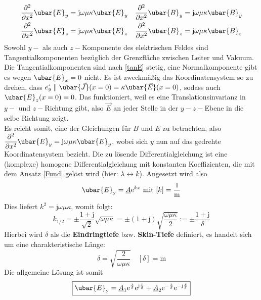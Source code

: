 			        \begin{align}
				        \dfrac{\partial^2}{\partial x^2} \ubar{E}_y & = \mathrm{j}\omega \mu \kappa \ubar{E}_y & \dfrac{\partial^2}{\partial x^2} \ubar{B}_y & = \mathrm{j}\omega \mu \kappa \ubar{B}_y \\
				        \dfrac{\partial^2}{\partial x^2} \ubar{E}_z & = \mathrm{j}\omega \mu \kappa \ubar{E}_z & \dfrac{\partial^2}{\partial x^2} \ubar{B}_z & = \mathrm{j}\omega \mu \kappa \ubar{B}_z
			        \end{align}
			    Sowohl $y-$ als auch $z-$Komponente des elektrischen Feldes sind Tangentialkomponenten bezüglich der Grenzfläche zwischen Leiter und Vakuum. Die Tangentialkomponenten sind nach \ref{tanE} stetig, eine Normalkomponente gibt es wegen $\ubar{E}_x=0$ nicht. Es ist zweckmäßig das Koordinatensystem so zu drehen, dass $\vec{e_y} \parallel \ubar{\vec{J}}(x=0) = \kappa\ubar{\vec{E}}(x=0)$, sodass auch $\ubar{E}_z(x=0)=0$. Das funktioniert, weil es eine Translationsinvarianz in $y-$ und $z-$Richtung gibt, also $\vec{E}$ an jeder Stelle in der $y-z-$Ebene in die selbe Richtung zeigt.\\
			    Es reicht somit, eine der Gleichungen für $B$ und $E$ zu betrachten, also $\dfrac{\partial^2}{\partial x^2} \ubar{E}_y = \mathrm{j}\omega \mu \kappa \ubar{E}_y$, wobei sich $y$ nun auf das gedrehte Koordinatensystem bezieht. Die zu lösende Differentialgleichung ist eine (komplexe) homogene Differentialgleichung mit konstanten Koeffizienten, die mit dem Ansatz \ref{Fund} gelöst wird (hier: $\lambda\leftrightarrow k$). Angesetzt wird also 
			   $$\ubar{E}_\mathrm{y} = \underline{A}  \mathrm{e}^{k x} \text{ mit } [k] = \mathrm{\frac{1}{m}}$$
		   Dies liefert $k^2 = \mathrm{j}\omega \mu \kappa$, womit folgt:
		        $$
			        k_{1/2} = \pm \dfrac{1 + \mathrm{j}}{\sqrt{2}} \sqrt{\omega \mu \kappa}
			        = \pm \left( 1 + \mathrm{j}\right) \sqrt{\dfrac{\omega \mu \kappa}{2}}
			        := \pm \dfrac{1 + \mathrm{j}}{\delta}
		        $$
		   Hierbei wird $\delta$ als die \textbf{Eindringtiefe} bzw. \textbf{Skin-Tiefe} definiert, es handelt sich um eine charakteristische Länge:
		        \begin{equation}
		        	 \boxed{ \delta = \sqrt{\dfrac{2}{\omega \mu \kappa}} } \quad [\delta] =\mathrm{m}
		        \end{equation}		        
		  Die allgemeine Lösung ist somit
		        \begin{equation}
			        \boxed{\ubar{E}_\mathrm{y} = \underline{A}_1  \mathrm{e}^{\frac{x}{\delta}}  \mathrm{e}^{\mathrm{j}\frac{x}{\delta}} + \underline{A}_2   \mathrm{e}^{-\frac{x}{\delta}}  \mathrm{e}^{-\mathrm{j}\frac{x}{\delta}} }
		        \end{equation}
